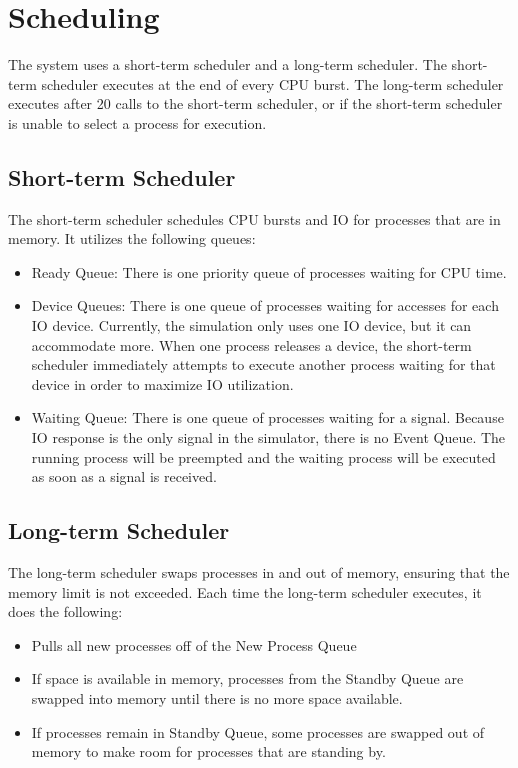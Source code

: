 \documentclass[paper=a4, fontsize=11pt]{scrartcl} %
\numberwithin{equation}{section} %
\numberwithin{figure}{section} %
\numberwithin{table}{section} %
\begin{document}
\section{Scheduling}

The system uses a short-term scheduler and a long-term scheduler. The short-term scheduler executes at the end of every CPU burst. The long-term scheduler executes after 20 calls to the short-term scheduler, or if the short-term scheduler is unable to select a process for execution.

\subsection{Short-term Scheduler}

The short-term scheduler schedules CPU bursts and IO for processes that are in memory. It utilizes the following queues:
\begin{itemize}
	\item Ready Queue: There is one priority queue of processes waiting for CPU time.
           \item Device Queues: There is one queue of processes waiting for accesses for each IO device. 
Currently, the simulation only uses one IO device, but it can accommodate more. When one process releases
a device, the short-term scheduler immediately attempts to execute another process waiting for that device in order to
maximize IO utilization.
	\item Waiting Queue: There is one queue of processes waiting for a signal. Because IO response is the only signal in the
simulator, there is no Event Queue. The running process will be preempted and the waiting process will be executed as soon as a signal is received.

\end{itemize}

\subsection{Long-term Scheduler}

The long-term scheduler swaps processes in and out of memory, ensuring that the memory limit is not exceeded. Each time the long-term scheduler executes, it does the following:
\begin{itemize}
	\item Pulls all new processes off of the New Process Queue
           \item If space is available in memory, processes from the Standby Queue are swapped into memory until there is no more space available.
	\item If processes remain in Standby Queue, some processes are swapped out of memory to make room for processes that are standing by.

\end{itemize}
\end{document}

